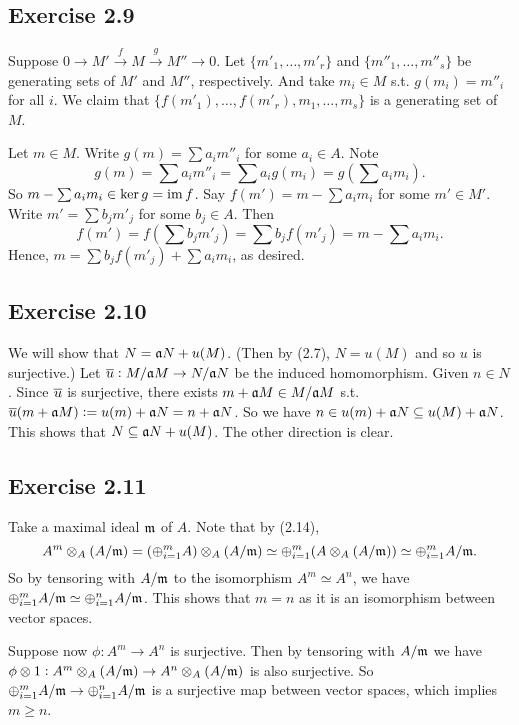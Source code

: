 \documentclass[../A&M.tex]{subfiles}
\begin{document}
\subsection*{Exercise 2.9}

Suppose $0 \to M' \overset{f}{\to} M \overset{g}{\to} M'' \to 0$. Let $\{m'_1,\ldots,m'_r\}$ and $\{m''_1,\ldots,m''_s\}$ be generating sets of $M'$ and $M''$, respectively. And take $m_i \in M$ s.t. $g(m_i) = m''_i$ for all $i$. We claim that $\{f(m'_1),\ldots,f(m'_r),m_1,\ldots,m_s\}$ is a generating set of $M$.

Let $m\in M$. Write $g(m) = \sum a_im''_i$ for some $a_i \in A$. Note
$$
g(m) = \sum a_im''_i = \sum a_ig(m_i) = g\left(\sum a_im_i\right).
$$
So $m-\sum a_im_i \in \ker g = \operatorname{im} f$. Say $f(m') = m-\sum a_im_i$ for some $m' \in M'$. Write $m' = \sum b_jm'_j$ for some $b_j\in A$. Then
$$
f(m') = f\left(\sum b_jm'_j\right) = \sum b_j f(m'_j) = m-\sum a_im_i.
$$
Hence, $m = \sum b_j f(m'_j) + \sum a_im_i$, as desired.

\subsection*{Exercise 2.10}

We will show that $N = \mathfrak{a} N + u(M)$. (Then by (2.7), $N = u(M)$ and so $u$ is surjective.) Let $\overline{u} : M/\mathfrak{a} M \to N/\mathfrak{a} N$ be the induced homomorphism. Given $n\in N$. Since $\overline{u}$ is surjective, there exists $m+\mathfrak{a} M \in M/\mathfrak{a} M$ s.t. $\overline{u}(m+\mathfrak{a} M) := u(m) + \mathfrak{a} N = n + \mathfrak{a} N$. So we have $n \in u(m) + \mathfrak{a} N \subseteq u(M) + \mathfrak{a} N$. This shows that $N \subseteq \mathfrak{a} N + u(M)$. The other direction is clear.

\subsection*{Exercise 2.11}

Take a maximal ideal $\mathfrak{m}$ of $A$. Note that by (2.14),
$$
A^m \otimes_A (A/\mathfrak{m}) = (\oplus_{i=1}^m A) \otimes_A (A/\mathfrak{m}) \simeq \oplus_{i=1}^m (A \otimes_A (A/\mathfrak{m})) \simeq \oplus_{i=1}^m A/\mathfrak{m}.
$$
So by tensoring with $A/\mathfrak{m}$ to the isomorphism $A^m \simeq A^n$, we have $\oplus_{i=1}^m A/\mathfrak{m} \simeq \oplus_{i=1}^n A/\mathfrak{m}$. This shows that $m=n$ as it is an isomorphism between vector spaces.

Suppose now $\phi : A^m \to A^n$ is surjective. Then by tensoring with $A/\mathfrak{m}$ we have $\phi \otimes 1: A^m \otimes_A (A/\mathfrak{m}) \to A^n \otimes_A (A/\mathfrak{m})$ is also surjective. So $\oplus_{i=1}^m A/\mathfrak{m} \to \oplus_{i=1}^n A/\mathfrak{m}$ is a surjective map between vector spaces, which implies $m\geq n$.
\end{document}
